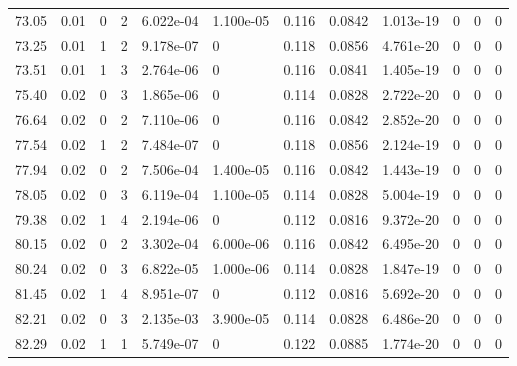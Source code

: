 \documentclass[preview]{standalone}
\begin{document}
{{{\begin{tabular}{L{1.2cm}C{1.2cm} C{0.3cm}C{0.5cm} C{1.4cm}C{1.4cm} C{1.4cm}C{1.4cm} C{1.6cm}C{1.6cm} C{1.6cm}C{1.6cm}}
  73.05  &  0.01  & 0     &  2 &  6.022e-04  & 1.100e-05  &  0.116&   0.0842& 1.013e-19 & 0   &  0 & 0  \\ 
  73.25  &  0.01  & 1     &  2 &  9.178e-07  & 0  &  0.118&   0.0856& 4.761e-20 & 0   &  0 & 0  \\ 
  73.51  &  0.01  & 1     &  3 &  2.764e-06  & 0  &  0.116&   0.0841& 1.405e-19 & 0   &  0 & 0  \\ 
  75.40  &  0.02  & 0     &  3 &  1.865e-06  & 0  &  0.114&   0.0828& 2.722e-20 & 0   &  0 & 0  \\ 
  76.64  &  0.02  & 0     &  2 &  7.110e-06  & 0  &  0.116&   0.0842& 2.852e-20 & 0   &  0 & 0  \\ 
  77.54  &  0.02  & 1     &  2 &  7.484e-07  & 0  &  0.118&   0.0856& 2.124e-19 & 0   &  0 & 0  \\ 
  77.94  &  0.02  & 0     &  2 &  7.506e-04  & 1.400e-05  &  0.116&   0.0842& 1.443e-19 & 0   &  0 & 0  \\ 
  78.05  &  0.02  & 0     &  3 &  6.119e-04  & 1.100e-05  &  0.114&   0.0828& 5.004e-19 & 0   &  0 & 0  \\ 
  79.38  &  0.02  & 1     &  4 &  2.194e-06  & 0  &  0.112&   0.0816& 9.372e-20 & 0   &  0 & 0  \\ 
  80.15  &  0.02  & 0     &  2 &  3.302e-04  & 6.000e-06  &  0.116&   0.0842& 6.495e-20 & 0   &  0 & 0  \\ 
  80.24  &  0.02  & 0     &  3 &  6.822e-05  & 1.000e-06  &  0.114&   0.0828& 1.847e-19 & 0   &  0 & 0  \\ 
  81.45  &  0.02  & 1     &  4 &  8.951e-07  & 0  &  0.112&   0.0816& 5.692e-20 & 0   &  0 & 0  \\ 
  82.21  &  0.02  & 0     &  3 &  2.135e-03  & 3.900e-05  &  0.114&   0.0828& 6.486e-20 & 0   &  0 & 0  \\ 
  82.29  &  0.02  & 1     &  1 &  5.749e-07  & 0  &  0.122&   0.0885& 1.774e-20 & 0   &  0 & 0  \\ 
\hline 
\end{tabular} 

}}}
\end{document}
